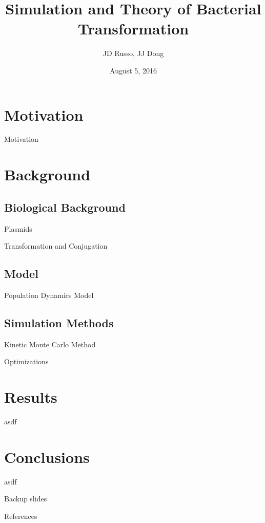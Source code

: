 \documentclass[10pt]{beamer}
\title{Simulation and Theory of Bacterial Transformation}
\date{August 5, 2016}
\author{JD Russo, JJ Dong}
\institute{Department of Physics and Astronomy, Bucknell University}
\begin{document}
\maketitle

\section{Motivation}
\begin{frame}{Motivation}
  \:
\end{frame}


\section{Background}
\subsection{Biological Background}
\begin{frame}[fragile]{Plasmids}
\:
\end{frame}

\begin{frame}{Transformation and Conjugation}
\:
\end{frame}


\subsection{Model}
\begin{frame}{Population Dynamics Model}
  \:
\end{frame}


\subsection{Simulation Methods}

\begin{frame}{Kinetic Monte Carlo Method}
  \:
\end{frame}

\begin{frame}{Optimizations}
  \:
\end{frame}

\section{Results}
asdf


\section{Conclusions}
asdf



\appendix

\begin{frame}[fragile]{Backup slides}
\end{frame}

\begin{frame}[allowframebreaks]{References}
  
  
\end{frame}
\end{document}
